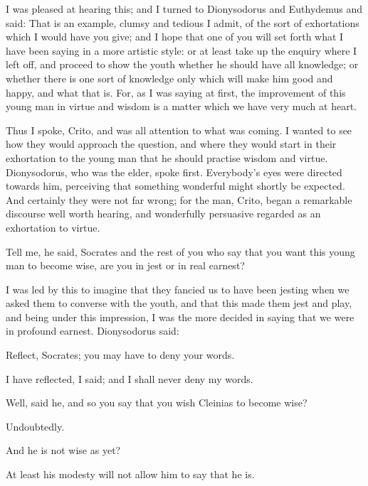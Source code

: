\documentclass[11pt,letter]{article}
\begin{document}
\par  I was pleased at hearing this; and I turned to Dionysodorus and Euthydemus and said: That is an example, clumsy and tedious I admit, of the sort of exhortations which I would have you give; and I hope that one of you will set forth what I have been saying in a more artistic style: or at least take up the enquiry where I left off, and proceed to show the youth whether he should have all knowledge; or whether there is one sort of knowledge only which will make him good and happy, and what that is. For, as I was saying at first, the improvement of this young man in virtue and wisdom is a matter which we have very much at heart.

\par  Thus I spoke, Crito, and was all attention to what was coming. I wanted to see how they would approach the question, and where they would start in their exhortation to the young man that he should practise wisdom and virtue. Dionysodorus, who was the elder, spoke first. Everybody's eyes were directed towards him, perceiving that something wonderful might shortly be expected. And certainly they were not far wrong; for the man, Crito, began a remarkable discourse well worth hearing, and wonderfully persuasive regarded as an exhortation to virtue.

\par  Tell me, he said, Socrates and the rest of you who say that you want this young man to become wise, are you in jest or in real earnest?

\par  I was led by this to imagine that they fancied us to have been jesting when we asked them to converse with the youth, and that this made them jest and play, and being under this impression, I was the more decided in saying that we were in profound earnest. Dionysodorus said:

\par  Reflect, Socrates; you may have to deny your words.

\par  I have reflected, I said; and I shall never deny my words.

\par  Well, said he, and so you say that you wish Cleinias to become wise?

\par  Undoubtedly.

\par  And he is not wise as yet?

\par  At least his modesty will not allow him to say that he is.
\end{document}

